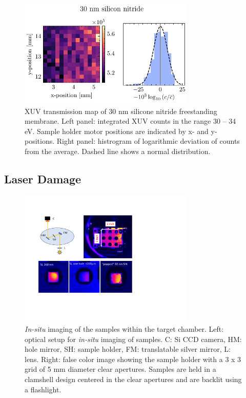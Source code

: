 \begin{figure}
	\centering
	\includegraphics[width=0.75\textwidth]{figures/chap4/nitride_map.pdf}
	\caption{XUV transmission map of 30 nm silicone nitride freestanding membrane. Left panel: integrated XUV counts in the range 30 -- 34 eV. Sample holder motor positions are indicated by x- and y-positions. Right panel: histrogram of logarithmic deviation of counts from the average. Dashed line shows a normal distribution.}
	\label{fig:nitride_map}
\end{figure}

\subsection{Laser Damage}
\label{sec:laser_damage}

\begin{figure}
	\centering
	\includegraphics[width=0.75\textwidth]{figures/chap4/sample_holder_damage.pdf}
	\caption{\textit{In-situ} imaging of the samples within the target chamber. Left: optical setup for \textit{in-situ} imaging of samples. C: Si CCD camera, HM: hole mirror, SH: sample holder, FM: translatable silver mirror, L: lens. Right: false color image showing the sample holder with a 3 x 3 grid of 5 mm diameter clear apertures. Samples are held in a clamshell design centered in the clear apertures and are backlit using a flashlight.}
	\label{fig:sample_holder_damage}
\end{figure}

